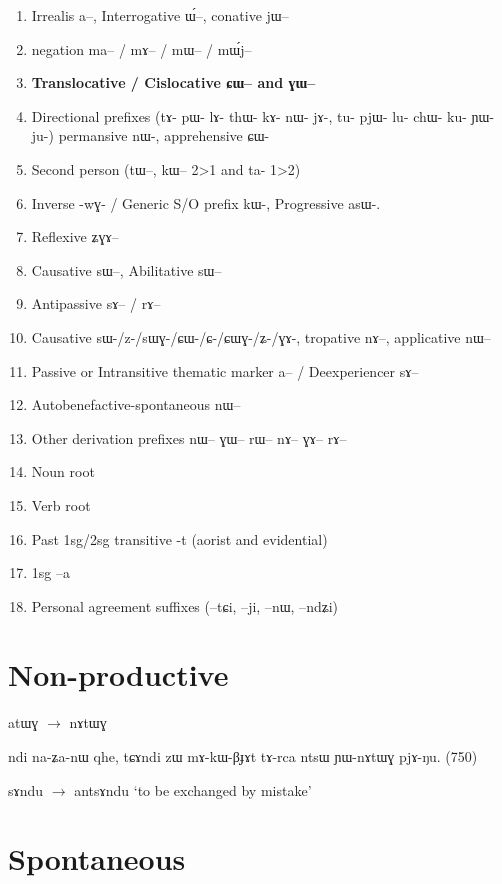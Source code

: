 \documentclass[oldfontcommands,oneside,a4paper,11pt]{article}
\newcommand{\ipa}[1]{{\phon \mbox{#1}}} %
\begin{document}
\begin{landscape}
\begin{multicols}{2}
\begin{enumerate}
\item Irrealis  \ipa{a}--, Interrogative \ipa{ɯ́}--, conative \ipa{jɯ}--
\item negation \ipa{ma}-- / \ipa{mɤ}-- / \ipa{mɯ}-- / \ipa{mɯ́j}--
\item \textbf{Translocative / Cislocative \ipa{ɕɯ}-- and \ipa{ɣɯ}--}
\item Directional prefixes (tɤ- pɯ- lɤ- thɯ- kɤ- nɯ- jɤ-, tu- pjɯ- lu- chɯ- ku- ɲɯ- ju-) permansive nɯ-, apprehensive ɕɯ-
\item Second person (\ipa{tɯ}--, \ipa{kɯ}-- 2>1 and ta- 1>2)
\item Inverse -\ipa{wɣ}- / Generic S/O prefix \ipa{kɯ}-, Progressive \ipa{asɯ}-. 
\item Reflexive \ipa{ʑɣɤ}-- 
\item Causative \ipa{sɯ}--, Abilitative \ipa{sɯ}--
\item  Antipassive  \ipa{sɤ}-- / \ipa{rɤ}--
\item Causative sɯ-/z-/sɯɣ-/ɕɯ-/ɕ-/ɕɯɣ-/ʑ-/ɣɤ-, tropative \ipa{nɤ}--, applicative \ipa{nɯ}--
\item Passive or Intransitive thematic marker \ipa{a}-- / Deexperiencer \ipa{sɤ}--
\item Autobenefactive-spontaneous \ipa{nɯ}--
\item Other derivation prefixes \ipa{nɯ}-- \ipa{ɣɯ}-- \ipa{rɯ}-- \ipa{nɤ}-- \ipa{ɣɤ}-- \ipa{rɤ}--
\item Noun root
\item Verb root 
\item Past 1sg/2sg transitive -\ipa{t} (aorist and evidential)
\item 1sg --\ipa{a}
\item Personal agreement suffixes (--\ipa{tɕi}, --\ipa{ji}, --\ipa{nɯ}, --\ipa{ndʑi})
\end{enumerate}


\end{multicols}
  \end{landscape}
\section{Non-productive}
 
 \ipa{atɯɣ} $\rightarrow$ \ipa{nɤtɯɣ}
 
 ndi na-ʑa-nɯ qhe,
tɕɤndi zɯ mɤ-kɯ-βɟɤt tɤ-rca ntsɯ ɲɯ-nɤtɯɣ pjɤ-ŋu. (750)

 \ipa{sɤndu}  $\rightarrow$ \ipa{antsɤndu} `to be exchanged by mistake'
\section{Spontaneous}
\end{document}
